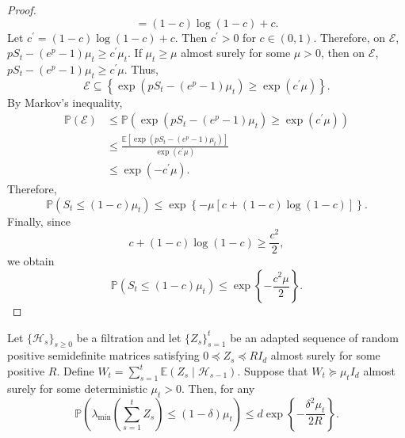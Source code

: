 \documentclass[12pt]{article}
\begin{document}
\begin{proof}
\[=
(1-c)\log(1-c)+c.
\]
Let $c^\prime=(1-c)\log(1-c)+c$. Then $c^\prime>0$ for $c\in(0,1)$. Therefore, on $\mathcal E$, $pS_t-(e^p-1)\mu_t\ge c^\prime \mu_t$.
If $\mu_t\ge \mu$ almost surely for some $\mu>0$, then on $\mathcal E$, $pS_t-(e^p-1)\mu_t\ge c^\prime \mu$.
Thus,
\[
\mathcal E
\subseteq
\left\{
\exp\left(
pS_t-(e^p-1)\mu_t
\right)
\ge
\exp(c^\prime\mu)
\right\}.
\]
By Markov's inequality,
\begin{align*}
\mathbb P(\mathcal E)
&\le
\mathbb P\left(
\exp\left(
pS_t-(e^p-1)\mu_t
\right)
\ge
\exp(c^\prime\mu)
\right) \\
&\le
\frac{
\mathbb E\left[
\exp\left(
pS_t-(e^p-1)\mu_t
\right)
\right]
}{
\exp(c^\prime\mu)
} \\
&\le
\exp(-c^\prime\mu).
\end{align*}
Therefore,
\[
\mathbb P\left(
S_t\le (1-c)\mu_t
\right)
\le
\exp\left\{
-\mu\left[
c+(1-c)\log(1-c)
\right]
\right\}.
\]
Finally, since
\[
c+(1-c)\log(1-c)
\ge
\frac{c^2}{2},
\]
we obtain
\[
\mathbb P\left(
S_t\le (1-c)\mu_t
\right)
\le
\exp\left\{
-\frac{c^2\mu}{2}
\right\}.
\]
\end{proof}


\begin{lemma}
\label{lem:adapted-matrix-chernoff}
Let $\{\mathcal H_s\}_{s\ge0}$ be a filtration and let $\{Z_s\}_{s=1}^t$ be an adapted sequence of random positive semidefinite matrices satisfying $0 \preceq Z_s \preceq R I_d$ almost surely for some positive $R$. Define $W_t = \sum_{s=1}^t \mathbb E\left( Z_s \mid \mathcal H_{s-1} \right)$. Suppose that $W_t \succeq \mu_t I_d$ almost surely for some deterministic $\mu_t>0$. Then, for any
\[
\mathbb P\left(
\lambda_{\min}
\left(
\sum_{s=1}^t Z_s
\right)
\le
(1-\delta)\mu_t
\right)
\le
d \exp\left\{- \frac{\delta^2\mu_t}{2R} \right\}.
\]
\end{lemma}
\end{document}
